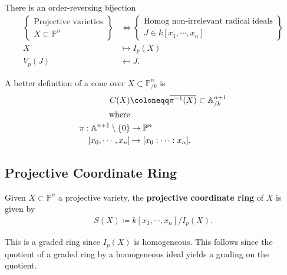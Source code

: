 \begin{corollary}[?]

There is an order-reversing bijection
\begin{align*}  
\left\{{\substack{\text{Projective varieties} \\ X\subset {\mathbb{P}}^n}}\right\}
&\iff
\left\{{\substack{\text{Homog non-irrelevant radical ideals} \\ J \in k[x_1, \cdots, x_{n}]}}\right\} \\
X &\mapsto I_p(X) \\
V_p(J) &\mapsfrom J
.\end{align*}

\end{corollary}

\begin{remark}

A better definition of a cone over \(X\subset {\mathbb{P}}^n_{/k}\) is
\begin{align*}  
C(X) &\coloneqq\mkern 1.5mu\overline{\mkern-1.5mu\pi^{-1}(X)\mkern-1.5mu}\mkern 1.5mu \subset {\mathbb{A}}^{n+1}_{/k} \\
\text{where} \\
\pi: {\mathbb{A}}^{n+1}\setminus\left\{{0}\right\}&\to {\mathbb{P}}^n \\
{\left[ {x_0, \cdots, x_n} \right]} &\mapsto {\left[ {x_0: \cdots: x_n} \right]}
.\end{align*}

\end{remark}

\hypertarget{projective-coordinate-ring}{%
\subsection{Projective Coordinate
Ring}\label{projective-coordinate-ring}}

\begin{definition}

Given \(X\subset {\mathbb{P}}^n\) a projective variety, the
\textbf{projective coordinate ring} of \(X\) is given by
\begin{align*}  
S(X) \coloneqq k[x_1, \cdots, x_{n}] / I_p(X)
.\end{align*}

\end{definition}

\begin{remark}

This is a graded ring since \(I_p(X)\) is homogeneous. This follows
since the quotient of a graded ring by a homogeneous ideal yields a
grading on the quotient.

\end{remark}

